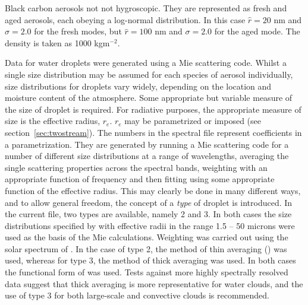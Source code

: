 \begin{enumerate}
Black carbon aerosols not not hygroscopic. They are represented as fresh
and aged aerosols, each obeying a log-normal distribution. In this case
$\hat r = 20$ nm and $\sigma=2.0$ for the fresh modes, 
but $\hat r = 100$ nm and $\sigma=2.0$ for the aged mode. 
The density is taken as 1000 kgm${}^{-2}$.

Data for water droplets were generated using a Mie scattering code. 
Whilst a single size distribution may be assumed for each species
of aerosol individually, size distributions for droplets vary widely,
depending on the location and moisture content of the atmosphere. Some
appropriate but variable measure of the size of droplet is required.
For radiative purposes, the
appropriate measure of size is the effective radius, $r_e$. $r_e$
may be parametrized or imposed (see section~\ref{sec:twostream}). The numbers in the
spectral file represent coefficients in a parametrization. They
are generated by running a Mie scattering code for a number of different
size distributions at a range of wavelengths, averaging the single
scattering properties across the spectral bands, weighting with an
appropriate function of frequency and then fitting using some appropriate
function of the effective radius. This may clearly be done in many
different ways, and to allow general freedom, the concept of a {\em
type} of droplet is introduced. In the current file, two types are available,
namely 2 and 3. In both cases the size distributions specified by 
\citet{Rockel91} with effective
radii in the range 1.5 -- 50 microns were used as 
the basis of the Mie calculations. Weighting
was carried out using the solar spectrum of \citet{Labs70}. In the case of
type 2, the method of thin averaging (\citet{Edwards96rc}) was used,
whereas for type 3, the method of thick averaging was used. In both cases
the functional form of \citet{Slingo82} was used. Tests against more
highly spectrally resolved data suggest that thick averaging is more 
representative for water clouds, and the use of type 3 for both large-scale
and convective clouds is recommended.


\end{enumerate}
